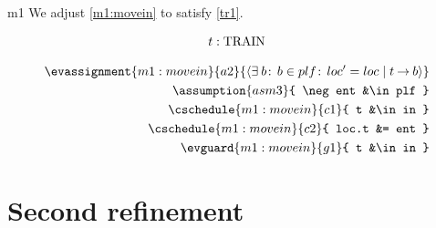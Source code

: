 \documentclass[12pt]{amsart}
\begin{document}
\begin{machine}{m1}
We adjust \ref{m1:movein} to satisfy \ref{tr1}.


\begin{align*}
\indices{m1:movein}{	t : \Train}
\end{align*}

\begin{align*}
\evassignment{m1:movein}{a2}
	{ \qexists{b}{b \in plf }{ loc' = loc \1| t \tfun b } }
\\ \assumption{asm3}
	{ \neg ent &\in plf }
\\ \cschedule{m1:movein}{c1}{ t &\in in } 
\\ \cschedule{m1:movein}{c2}{ loc.t &= ent }
\\ \evguard{m1:movein}{g1}{ t &\in in }
\end{align*}
%
\end{machine}

\section{Second refinement}
\end{document}
